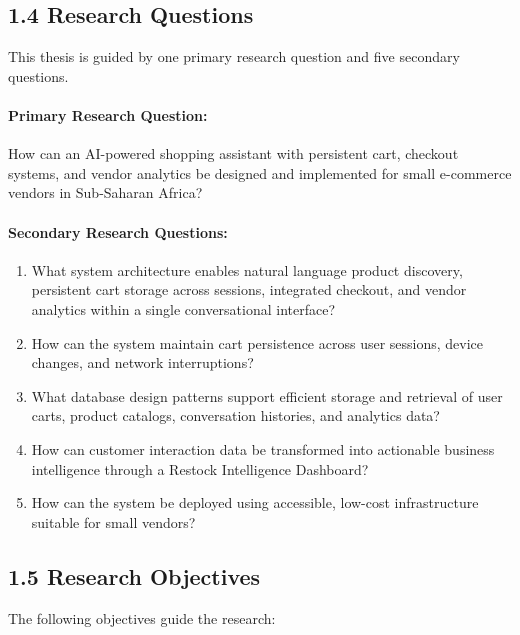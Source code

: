 \documentclass[12pt,a4paper]{article}
\begin{document}
\subsection{1.4 Research Questions}

This thesis is guided by one primary research question and five secondary questions.

\paragraph{Primary Research Question:}

How can an AI-powered shopping assistant with persistent cart, checkout systems, and vendor analytics be designed and implemented for small e-commerce vendors in Sub-Saharan Africa?

\paragraph{Secondary Research Questions:}

\begin{enumerate}
    \item What system architecture enables natural language product discovery, persistent cart storage across sessions, integrated checkout, and vendor analytics within a single conversational interface?
    \item How can the system maintain cart persistence across user sessions, device changes, and network interruptions?
    \item What database design patterns support efficient storage and retrieval of user carts, product catalogs, conversation histories, and analytics data?
    \item How can customer interaction data be transformed into actionable business intelligence through a Restock Intelligence Dashboard?
    \item How can the system be deployed using accessible, low-cost infrastructure suitable for small vendors?
\end{enumerate}

\subsection{1.5 Research Objectives}

The following objectives guide the research:
\end{document}
